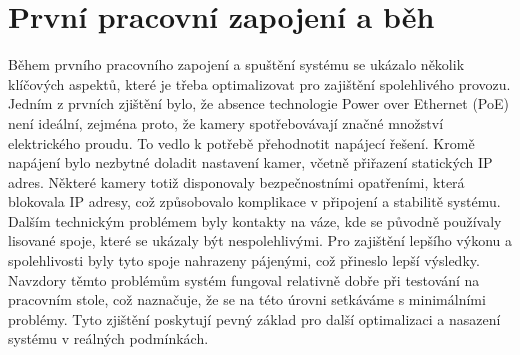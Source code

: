 \section{První pracovní zapojení a běh}\label{sec:prvni-pracovni-zapojeni-a-beh}
Během prvního pracovního zapojení a spuštění systému se ukázalo několik klíčových aspektů, které je třeba optimalizovat pro zajištění spolehlivého provozu.
Jedním z prvních zjištění bylo, že absence technologie Power over Ethernet (PoE) není ideální, zejména proto, že kamery spotřebovávají značné množství elektrického proudu.
To vedlo k potřebě přehodnotit napájecí řešení.
\newline
Kromě napájení bylo nezbytné doladit nastavení kamer, včetně přiřazení statických IP adres.
Některé kamery totiž disponovaly bezpečnostními opatřeními, která blokovala IP adresy, což způsobovalo komplikace v připojení a stabilitě systému.
\newline
Dalším technickým problémem byly kontakty na váze, kde se původně používaly lisované spoje, které se ukázaly být nespolehlivými.
Pro zajištění lepšího výkonu a spolehlivosti byly tyto spoje nahrazeny pájenými, což přineslo lepší výsledky.
\newline
Navzdory těmto problémům systém fungoval relativně dobře při testování na pracovním stole, což naznačuje, že se na této úrovni setkáváme s minimálními problémy.
Tyto zjištění poskytují pevný základ pro další optimalizaci a nasazení systému v reálných podmínkách.


\newpage


